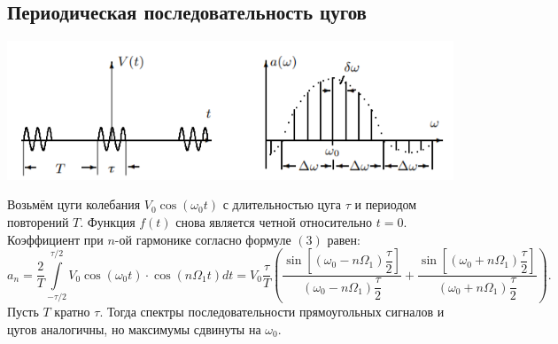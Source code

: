 \subsection*{Периодическая последовательность цугов}
\begin{center}
\includegraphics[scale=0.9]{3.png}
\end{center}
Возьмём цуги колебания $V_0 \cos(\omega_0 t)$ с длительностью цуга $\tau$ и периодом повторений $T$.\n\n
Функция $f(t)$ снова является четной относительно $t = 0$. Коэффициент при $n$-ой гармонике согласно формуле $(3)$ равен:
\begin{equation}
a_n = \dfrac{2}{T}\int\limits_{-\tau/2}^{\tau/2}V_0 \cos \left(\omega_0t\right) \cdot \cos\left(n \Omega_1t\right)dt = V_0 \dfrac{\tau}{T}\left( \dfrac{\sin\left[\left(\omega_0 - n \Omega_1\right)\dfrac{\tau}{2}\right]}{\left( \omega_0 - n \Omega_1\right) \dfrac{\tau}{2}} + \dfrac{\sin\left[\left(\omega_0 + n \Omega_1\right)\dfrac{\tau}{2}\right]}{\left( \omega_0 + n \Omega_1\right) \dfrac{\tau}{2}}\right).
\end{equation}
Пусть $T$ кратно $\tau$. Тогда спектры последовательности прямоугольных сигналов и цугов аналогичны, но максимумы сдвинуты на $\omega_0$.
